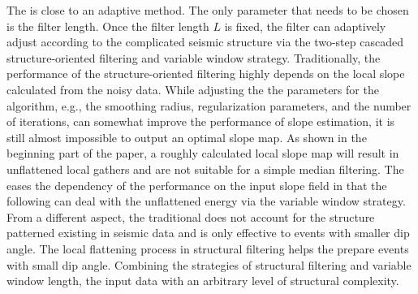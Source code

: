 The  is close to an adaptive method. The only parameter that needs to be chosen is the filter length. Once the filter length $L$ is fixed, the filter can adaptively adjust according to the complicated seismic structure via the two-step cascaded structure-oriented filtering and variable window strategy. Traditionally, the performance of the structure-oriented filtering highly depends on the local slope calculated from the noisy data. While adjusting the the parameters for the  algorithm, e.g., the smoothing radius, regularization parameters, and the number of iterations, can somewhat improve the performance of slope estimation, it is still almost impossible to output an optimal slope map. As shown in the beginning part of the paper, a roughly calculated local slope map will result in unflattened local gathers and are not suitable for a simple median filtering. The  eases the dependency of the performance on the input slope field in that the following  can deal with the unflattened energy via the variable window strategy. From a different aspect, the traditional  does not account for the structure patterned existing in seismic data and is only effective to events with smaller dip angle. The local flattening process in structural filtering helps the  prepare events with small dip angle. Combining the strategies of structural filtering and variable window length, the   input data with an arbitrary level of structural complexity. 


